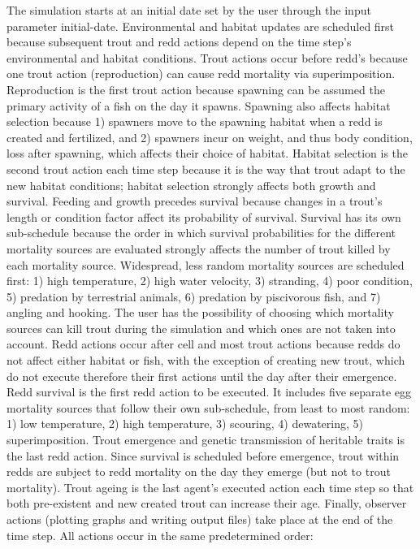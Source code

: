\documentclass[
  man,
  10pt,
  a4paper,
  floatsintext
]{apa7}
\begin{document}
{
  \color{gddarkredb}
  The simulation starts at an initial date set by the user through the input parameter initial-date. Environmental and habitat updates are scheduled first because subsequent trout and redd actions depend on the time step's environmental and habitat conditions. Trout actions occur before redd's because one trout action (reproduction) can cause redd mortality via superimposition. Reproduction is the first trout action because spawning can be assumed the primary activity of a fish on the day it spawns. Spawning also affects habitat selection because 1) spawners move to the spawning habitat when a redd is created and fertilized, and 2) spawners incur on weight, and thus body condition, loss after spawning, which affects their choice of habitat. Habitat selection is the second trout action each time step because it is the way that trout adapt to the new habitat conditions; habitat selection strongly affects both growth and survival. Feeding and growth precedes survival because changes in a trout's length or condition factor affect its probability of survival. Survival has its own sub-schedule because the order in which survival probabilities for the different mortality sources are evaluated strongly affects the number of trout killed by each mortality source. Widespread, less random mortality sources are scheduled first: 1) high temperature, 2) high water velocity, 3) stranding, 4) poor condition, 5) predation by terrestrial animals, 6) predation by piscivorous fish, and 7) angling and hooking. The user has the possibility of choosing which mortality sources can kill trout during the simulation and which ones are not taken into account. Redd actions occur after cell and most trout actions because redds do not affect either habitat or fish, with the exception of creating new trout, which do not execute therefore their first actions until the day after their emergence. Redd survival is the first redd action to be executed. It includes five separate egg mortality sources that follow their own sub-schedule, from least to most random: 1) low temperature, 2) high temperature, 3) scouring, 4) dewatering, 5) superimposition. Trout emergence and genetic transmission of heritable traits is the last redd action. Since survival is scheduled before emergence, trout within redds are subject to redd mortality on the day they emerge (but not to trout mortality). Trout ageing is the last agent's executed action each time step so that both pre-existent and new created trout can increase their age. Finally, observer actions (plotting graphs and writing output files) take place at the end of the time step. All actions occur in the same predetermined order:

}
\end{document}

